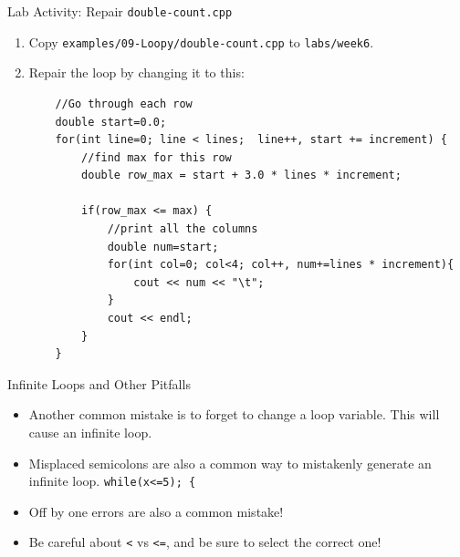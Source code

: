 \documentclass[]{beamer}
\begin{document}
\begin{frame}[fragile]{Lab Activity: Repair \texttt{double-count.cpp}}
    \begin{enumerate}
        \item Copy \texttt{examples/09-Loopy/double-count.cpp} to
            \texttt{labs/week6}.
        \item Repair the loop by changing it to this:
        \begin{adjustbox}{max width=0.9\textwidth}
        \begin{BVerbatim}
    //Go through each row
    double start=0.0;
    for(int line=0; line < lines;  line++, start += increment) {
        //find max for this row
        double row_max = start + 3.0 * lines * increment; 

        if(row_max <= max) {
            //print all the columns
            double num=start;
            for(int col=0; col<4; col++, num+=lines * increment){
                cout << num << "\t";
            }
            cout << endl;
        }
    }
        \end{BVerbatim}
        \end{adjustbox}
    \end{enumerate}
\end{frame}

\begin{frame}{Infinite Loops and Other Pitfalls}
    \begin{itemize}[<+->]
        \item Another common mistake is to forget to change a loop
            variable.  This will cause an infinite loop.
        \item Misplaced semicolons are also a common way to mistakenly
            generate an infinite loop.
            \newline\texttt{while(x<=5); \{}
        \item Off by one errors are also a common mistake!
        \item Be careful about \texttt{<} vs \texttt{<=}, and be sure
            to select the correct one!
    \end{itemize}
\end{frame}
\end{document}
